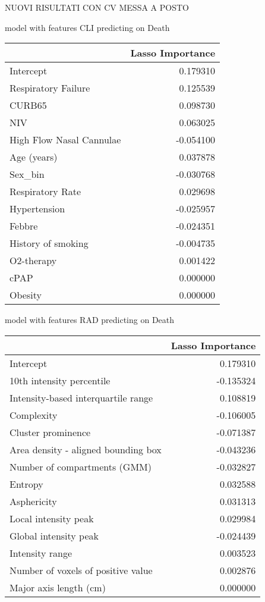 NUOVI RISULTATI CON CV MESSA A POSTO

model with features CLI predicting on Death\newline
\begin{tabular}{lr}
\toprule
{} &  Lasso Importance \\
\midrule
Intercept                &          0.179310 \\
Respiratory Failure      &          0.125539 \\
CURB65                   &          0.098730 \\
NIV                      &          0.063025 \\
High Flow Nasal Cannulae &         -0.054100 \\
Age (years)              &          0.037878 \\
Sex\_bin                  &         -0.030768 \\
Respiratory Rate         &          0.029698 \\
Hypertension             &         -0.025957 \\
Febbre                   &         -0.024351 \\
History of smoking       &         -0.004735 \\
O2-therapy               &          0.001422 \\
cPAP                     &          0.000000 \\
Obesity                  &          0.000000 \\
\bottomrule
\end{tabular}

model with features RAD predicting on Death\newline
\begin{tabular}{lr}
\toprule
{} &  Lasso Importance \\
\midrule
Intercept                           &          0.179310 \\
10th intensity percentile           &         -0.135324 \\
Intensity-based interquartile range &          0.108819 \\
Complexity                          &         -0.106005 \\
Cluster prominence                  &         -0.071387 \\
Area density - aligned bounding box &         -0.043236 \\
Number of compartments (GMM)        &         -0.032827 \\
Entropy                             &          0.032588 \\
Asphericity                         &          0.031313 \\
Local intensity peak                &          0.029984 \\
Global intensity peak               &         -0.024439 \\
Intensity range                     &          0.003523 \\
Number of voxels of positive value  &          0.002876 \\
Major axis length (cm)              &          0.000000 \\
\bottomrule
\end{tabular}

